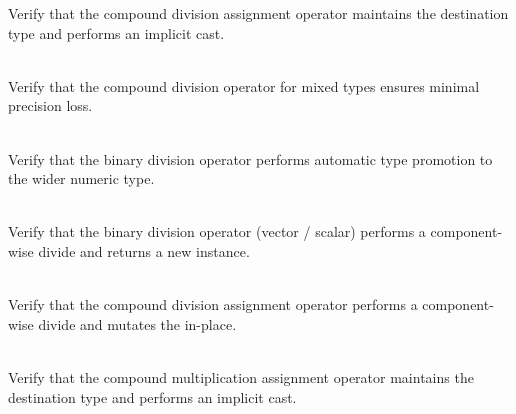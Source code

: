 \begin{DoxyRefList}
\label{test__test000038}%
%
Verify that the compound division assignment operator maintains the destination type and performs an implicit cast.  
\item[{\parbox[t]{\linewidth}{Member \doxylink{group___f_g_m___vec4___division_ga7a5758a23acd48130a6a550ab4933b9e}{Vector4\+DScalar\+Division\+\_\+\+Mixed\+Type\+Scalar\+Division\+Assignment\+Gives\+Result\+With\+Minimal\+Precision\+Loss} ()}}]\hfill \\
\label{test__test000039}%
%
Verify that the compound division operator for mixed types ensures minimal precision loss.  
\item[{\parbox[t]{\linewidth}{Member \doxylink{group___f_g_m___vec4___division_ga1998720892d4508dadeb805f74ae6469}{Vector4\+DScalar\+Division\+\_\+\+Mixed\+Type\+Scalar\+Division\+Promotes\+Type} ()}}]\hfill \\
\label{test__test000037}%
%
Verify that the binary division operator performs automatic type promotion to the wider numeric type.  
\item[{\parbox[t]{\linewidth}{Member \doxylink{group___f_g_m___vec4___division_gab4fbb04fb9f5cc50edc858906e2fda48}{Vector4\+DScalar\+Division\+\_\+\+Vector\+Divided\+By\+ANumber\+Returns\+AScaled\+Vector} ()}}]\hfill \\
\label{test__test000035}%
%
Verify that the binary division operator (vector /\+ scalar) performs a component-\/wise divide and returns a new  instance.  
\item[{\parbox[t]{\linewidth}{Member \doxylink{group___f_g_m___vec4___division_ga16b591d97ec9692ed447a0988434906b}{Vector4\+DScalar\+Division\+\_\+\+Vector\+Divide\+Equals\+ANumber\+Is\+The\+Same\+Vector\+Scaled} ()}}]\hfill \\
\label{test__test000036}%
%
Verify that the compound division assignment operator performs a component-\/wise divide and mutates the  in-\/place.  
\item[{\parbox[t]{\linewidth}{Member \doxylink{group___f_g_m___vec4___multiplication_ga6e7ade93e5ce3180feef5759d8ca8057}{Vector4\+DScalar\+Multiplication\+\_\+\+Mixed\+Type\+Scalar\+Multiplication\+Assignment\+Does\+Not\+Promote\+Type} ()}}]\hfill \\
\label{test__test000031}%
%
Verify that the compound multiplication assignment operator maintains the destination type and performs an implicit cast.  

\end{DoxyRefList}
